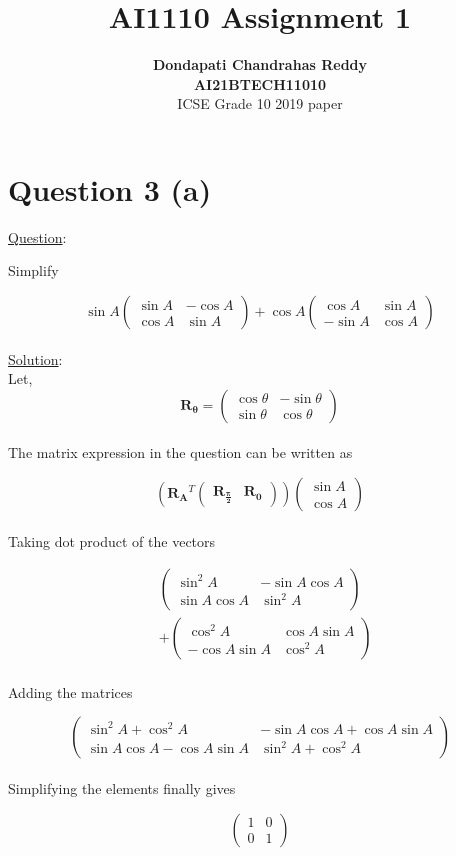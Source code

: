 \documentclass[journal,12pt,twocolumn]{IEEEtran}
\newcommand{\myvec}[1]{\ensuremath{\begin{pmatrix}#1\end{pmatrix}}}
\let\vec\mathbf
\begin{document}
\title{\textbf{AI1110 Assignment 1} }
\author{\textbf{Dondapati Chandrahas Reddy}\\ \textbf{AI21BTECH11010}\\ ICSE Grade 10 2019 paper}

\maketitle

{\section {Question 3 (a) \newline}}

{\large \underline{Question}:\newline}

Simplify

\begin{equation}
	\sin A\myvec{\sin A &  -\cos A \\ \cos A & \sin A} + \cos A \myvec{\cos A &  \sin A \\ -\sin A & \cos A}
\end{equation}\\

{\large \underline{Solution}:}\\

Let,
\begin{equation}
	\vec{R_\theta} = \myvec{\cos \theta &  -\sin \theta \\ \sin \theta & \cos \theta}
\end{equation}\\

The matrix expression in the question can be written as

\begin{equation}
	\left(\vec{R_A}^T \myvec{\vec{R_{\frac{\pi}{2}}} & \vec{R_0}}\right) \myvec{\sin A \\ \cos A}
\end{equation}\\

Taking dot product of the vectors

\begin{align}
	& \myvec{\sin^2 A &  -\sin A\cos A \\ \sin A\cos A & \sin^2 A} \nonumber \\ 
	& + \myvec{\cos^2 A & \cos A\sin A \\ -\cos A\sin A & \cos^2 A}
\end{align}\\

Adding the matrices

\begin{equation}
	\myvec{\sin^2 A + \cos^2 A &  -\sin A \cos A +\cos A \sin A \\ \sin A \cos A -\cos A \sin A & \sin^2 A + \cos^2 A}
\end{equation}\\

Simplifying the elements finally gives

\begin{equation}
	\myvec{1 & 0 \\ 0 & 1}
\end{equation}\\
\end{document}

